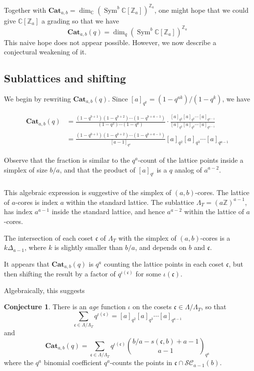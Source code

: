 \documentclass{amsart}[12pt]
\theoremstyle{definition}
\newtheorem{conjecture}[dummy]{Conjecture}
\newcommand{\Z}{\mathbb{Z}}
\newcommand{\C}{\mathbb{C}}
\newcommand{\Cat}{\mathbf{Cat}}
\DeclareMathOperator{\Sym}{Sym}
\begin{document}
Together with $\Cat_{a,b}=\dim_\C(\Sym^b\C[\Z_a])^{\Z_a}$, one
might hope that we could give $\C[\Z_a]$ a grading so that we have
$$\Cat_{a,b}(q)=\dim_q(\Sym^b \C[\Z_a])^{\Z_a}$$
This naive hope does not appear possible.  However, we now describe a
conjectural weakening of it.

\subsection{Sublattices and shifting}

We begin by rewriting $\Cat_{a,b}(q)$.  Since $[a]_{q^k}=(1-q^{ak})/(1-q^k)$, we have

\begin{align*}
\Cat_{a,b}(q)&=\frac{(1-q^{b+1})(1-q^{b+2})\cdots (1-q^{b+a-1})}{(1-q^2)\cdots(1-q^a)} \cdot \frac{[a]_{q^2}[a]_{q^3}\cdots[a]_{q^{a-1}}}{[a]_{q^2}[a]_{q^3}\cdots[a]_{q^{a-1}}} \\
&=\frac{(1-q^{b+1})(1-q^{b+2})\cdots (1-q^{b+a-1})}{[a-1]_{q^a}}[a]_{q^2}[a]_{q^3}\cdots[a]_{q^{a-1}}
\end{align*}

Observe that the fraction is similar to the $q^a$-count of the lattice
points inside a simplex of size $b/a$, and that the product of $[a]_{q^i}$ is a $q$ analog of $a^{a-2}$.

\subsubsection{}
This algebraic expression is suggestive of the simplex of
$(a,b)$-cores.  The lattice of $a$-cores is index $a$ within
the standard lattice.  The sublattice $\Lambda_T=(a\Z)^{a-1}$, has index $a^{a-1}$ inside the standard lattice, and hence $a^{a-2}$ within the lattice of $a$-cores.

The intersection of each coset $\mathfrak{c}$ of $\Lambda_T$ with the simplex of
$(a,b)$-cores is a $k\Delta_{a-1}$, where $k$ is slightly smaller than $b/a$, and depends on $b$ and $\mathfrak{c}$.


It appears that
$\Cat_{a,b}(q)$ is $q^a$ counting the lattice points in each coset $\mathfrak{c}$,
but then shifting the result by a factor of $q^{\iota(\mathfrak{c})}$ for some $\iota(\mathfrak{c})$.

Algebraically, this suggests
\begin{conjecture} \label{conj:cosets}
There is an \emph{age} function $\iota$ on the cosets $\mathfrak{c}\in\Lambda/\Lambda_T$, so that
$$\sum_{\mathfrak{c}\in\Lambda/\Lambda_T} q^{\iota(\mathfrak{c})}=[a]_{q^2}[a]_{q^3}\cdots[a]_{q^{a-1}}$$
 and
$$\Cat_{a,b}(q)=\sum_{\mathfrak{c}\in\Lambda/\Lambda_T} q^{\iota(\mathfrak{c})} \binom{b/a-s(\mathfrak{c},b)+a-1 }{a-1}_{q^a}$$
where the $q^a$ binomial coefficient $q^a$-counts the points in $\mathfrak{c}\cap \mathcal{SC}_{a-1}(b)$.
\end{conjecture}
\end{document}
